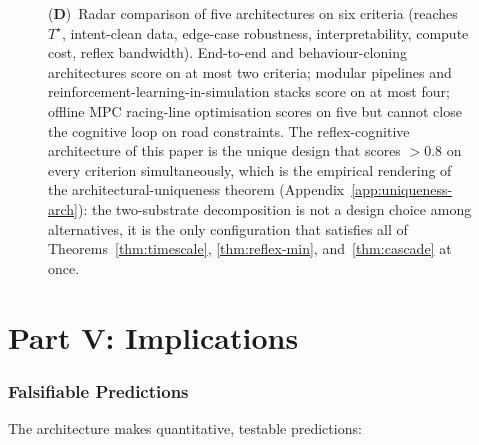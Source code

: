 \documentclass[11pt,twocolumn]{article}
\theoremstyle{definition}
\theoremstyle{remark}
\begin{document}
\begin{figure}[!htbp]
{    (\textbf{D})~Radar comparison of five architectures on six criteria (reaches $T^\star$, intent-clean data, edge-case robustness, interpretability, compute cost, reflex bandwidth). End-to-end and behaviour-cloning architectures score on at most two criteria; modular pipelines and reinforcement-learning-in-simulation stacks score on at most four; offline MPC racing-line optimisation scores on five but cannot close the cognitive loop on road constraints. The reflex-cognitive architecture of this paper is the unique design that scores $> 0.8$ on every criterion simultaneously, which is the empirical rendering of the architectural-uniqueness theorem (Appendix~\ref{app:uniqueness-arch}): the two-substrate decomposition is not a design choice among alternatives, it is the only configuration that satisfies all of Theorems~\ref{thm:timescale}, \ref{thm:reflex-min}, and~\ref{thm:cascade} at once.}
    \label{fig:panel5}
\end{figure}

\part*{Part V: Implications}

\section{Falsifiable Predictions}
\label{sec:predictions}

The architecture makes quantitative, testable predictions:
\end{document}
